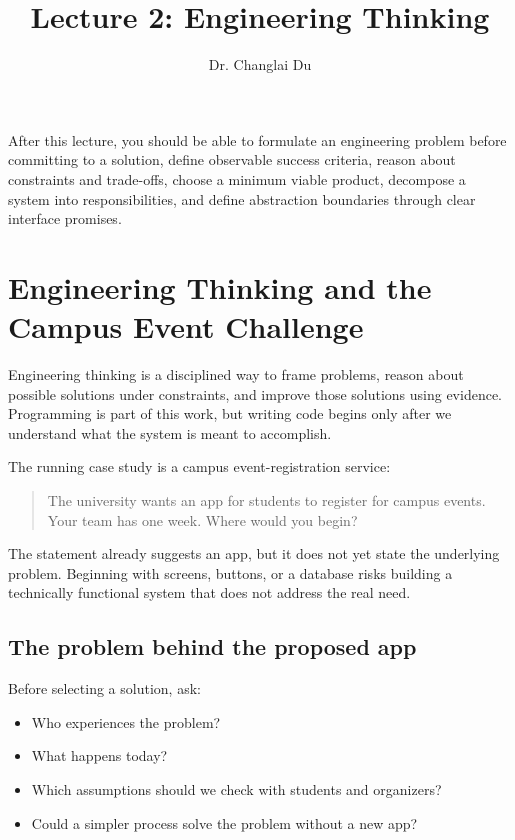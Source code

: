 \documentclass[11pt]{article}
\title{\vspace{-2em}\textbf{Lecture 2: Engineering Thinking}}
\author{Dr. Changlai Du}
\date{}
\begin{document}
\maketitle

\begin{keyidea}
After this lecture, you should be able to formulate an engineering problem before committing to a solution, define observable success criteria, reason about constraints and trade-offs, choose a minimum viable product, decompose a system into responsibilities, and define abstraction boundaries through clear interface promises.
\end{keyidea}

\tableofcontents

\section{Engineering Thinking and the Campus Event Challenge}

Engineering thinking is a disciplined way to frame problems, reason about possible solutions under constraints, and improve those solutions using evidence. Programming is part of this work, but writing code begins only after we understand what the system is meant to accomplish.

The running case study is a campus event-registration service:
\begin{quote}
The university wants an app for students to register for campus events. Your team has one week. Where would you begin?
\end{quote}

The statement already suggests an app, but it does not yet state the underlying problem. Beginning with screens, buttons, or a database risks building a technically functional system that does not address the real need.

\subsection{The problem behind the proposed app}

Before selecting a solution, ask:
\begin{itemize}
  \item Who experiences the problem?
  \item What happens today?
  \item Which assumptions should we check with students and organizers?
  \item Could a simpler process solve the problem without a new app?
\end{itemize}
\end{document}
